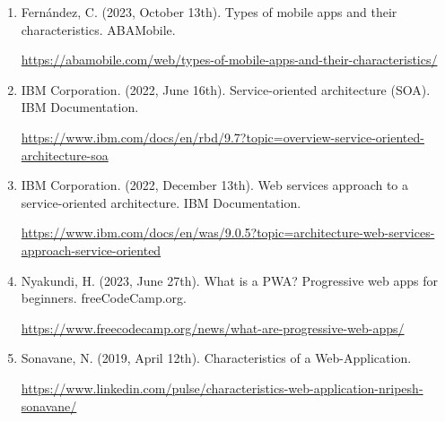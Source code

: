 \documentclass[12pt,a4paper]{article}
\begin{document}
    \begin{enumerate}
    
      \item Fernández, C. (2023, October 13th). Types of mobile apps and their characteristics. ABAMobile. 
      
      \href{https://abamobile.com/web/types-of-mobile-apps-and-their-characteristics/ }{https://abamobile.com/web/types-of-mobile-apps-and-their-characteristics/ }
      
      \item IBM Corporation. (2022, June 16th). Service-oriented architecture (SOA). IBM Documentation.
      
      \href{https://www.ibm.com/docs/en/rbd/9.7?topic=overview-service-oriented-architecture-soa }{https://www.ibm.com/docs/en/rbd/9.7?topic=overview-service-oriented-architecture-soa }
      
      \item IBM Corporation. (2022, December 13th). Web services approach to a service-oriented architecture. IBM Documentation.
      
      \href{https://www.ibm.com/docs/en/was/9.0.5?topic=architecture-web-services-approach-service-oriented }{https://www.ibm.com/docs/en/was/9.0.5?topic=architecture-web-services-approach-service-oriented}
      
      \item Nyakundi, H. (2023, June 27th). What is a PWA? Progressive web apps for beginners. freeCodeCamp.org. 
      
      \href{https://www.freecodecamp.org/news/what-are-progressive-web-apps/}{https://www.freecodecamp.org/news/what-are-progressive-web-apps/}
      
      \item Sonavane, N. (2019, April 12th). Characteristics of a Web-Application. 
      
      \href{https://www.linkedin.com/pulse/characteristics-web-application-nripesh-sonavane/ }{https://www.linkedin.com/pulse/characteristics-web-application-nripesh-sonavane/ }
      
    \end{enumerate}
	
	
\end{document}
